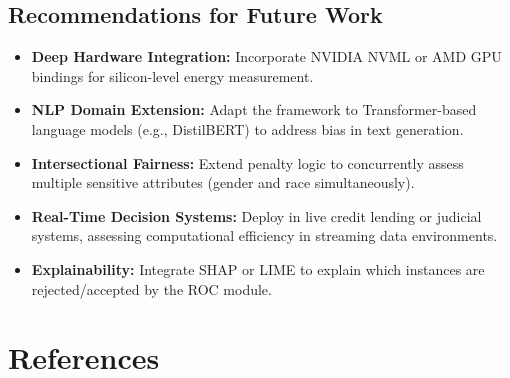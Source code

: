 \documentclass[12pt,a4paper]{article}
\begin{document}
\subsection{Recommendations for Future Work}

\begin{itemize}
    \item \textbf{Deep Hardware Integration:} Incorporate NVIDIA NVML or AMD GPU bindings for silicon-level energy measurement.
    \item \textbf{NLP Domain Extension:} Adapt the framework to Transformer-based language models (e.g., DistilBERT) to address bias in text generation.
    \item \textbf{Intersectional Fairness:} Extend penalty logic to concurrently assess multiple sensitive attributes (gender and race simultaneously).
    \item \textbf{Real-Time Decision Systems:} Deploy in live credit lending or judicial systems, assessing computational efficiency in streaming data environments.
    \item \textbf{Explainability:} Integrate SHAP or LIME to explain which instances are rejected/accepted by the ROC module.
\end{itemize}

\newpage
\section*{References}
\end{document}
